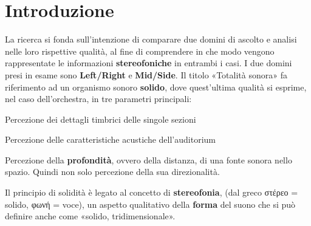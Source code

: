 \newcommand{\mylanguages}{italian} %
\newcommand{\mytitle}{Totalità sonora: il corpo dell'orchestra}
\newcommand{\mysubtitle}{Per ascoltare l'organismo sonoro orchestrale nel suo complesso e nei singoli dettagli}
\newcommand{\authorone}{Giancarlo Bottalico}
\newcommand{\institutione}{Conservatorio di musica "N. Piccinni", Bari}
\newcommand{\emailone}{giancarlobottalico@gmail.com}


	\maketitle
	\thispagestyle{empty}
	
	\section*{Introduzione}
	La ricerca si fonda sull'intenzione di comparare due domini di ascolto e analisi nelle loro rispettive qualità, al fine di comprendere in che modo vengono rappresentate le informazioni \textbf{stereofoniche} in entrambi i casi.
	I due domini presi in esame sono \textbf{Left/Right} e \textbf{Mid/Side}.
	Il titolo «Totalità sonora» fa riferimento ad un organismo sonoro \textbf{solido}, dove quest'ultima qualità si esprime, nel caso dell'orchestra, in tre parametri principali:
	\begin{compactitem} 
		\item Percezione dei dettagli timbrici delle singole sezioni
		\item Percezione delle caratteristiche  acustiche  dell'auditorium
		\item Percezione della \textbf{profondità}, ovvero della distanza, di una fonte sonora nello spazio. Quindi non solo percezione della sua direzionalità.
	\end{compactitem}
	Il principio di solidità è legato al concetto di \textbf{stereofonia}, (dal greco στέρεο = solido, φωνή = voce), un aspetto qualitativo della \textbf{forma} del suono che si può definire anche come «solido, tridimensionale».
	
